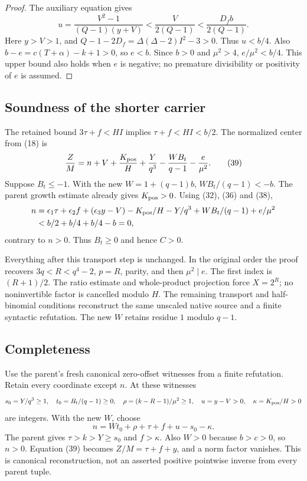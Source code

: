 \begin{proof}
The auxiliary equation gives
\[
u=\frac{V^2-1}{(Q-1)(y+V)}
<\frac{V}{2(Q-1)}<\frac{D_fb}{2(Q-1)}.
\]
Here $y>V>1$, and
$Q-1-2D_f=\Delta(\Delta-2)I^2-3>0$.
Thus $u<b/4$.
Also $b-e=c(T+\alpha)-k+1>0$, so $e<b$.
Since $b>0$ and $\mu^2>4$, $e/\mu^2<b/4$.
This upper bound also holds when $e$ is negative; no premature
divisibility or positivity of $e$ is assumed.
\end{proof}

\subsection{Soundness of the shorter carrier}

The retained bound $3\tau+f<HI$ implies $\tau+f<HI<b/2$.
The normalized center from (18) is
\[
\frac ZM=n+V+\frac{K_{\rm pos}}H+\frac Y{q^3}
-\frac{WB_t}{q-1}-\frac e{\mu^2}.
\tag{39}
\]
Suppose $B_t\le-1$.
With the new $W=1+(q-1)b$, $WB_t/(q-1)<-b$.
The parent growth estimate already gives $K_{\rm pos}>0$.
Using (32), (36) and (38),
\[
\begin{split}
n
&=\epsilon_1\tau+\epsilon_2f+(\epsilon_3y-V)
-K_{\rm pos}/H-Y/q^3+WB_t/(q-1)+e/\mu^2\\
&<b/2+b/4+b/4-b=0,
\end{split}
\]
contrary to $n>0$. Thus $B_t\ge0$ and hence $C>0$.

Everything after this transport step is unchanged.
In the original order the proof recovers $3q<R<q^4-2$, $p=R$, parity,
and then $\mu^2\mid e$. The first index is $(R+1)/2$.
The ratio estimate and whole-product projection force $X=2^R$;
no noninvertible factor is cancelled modulo $H$.
The remaining transport and half-binomial conditions reconstruct the
same unscaled native source and a finite syntactic refutation.
The new $W$ retains residue $1$ modulo $q-1$.

\subsection{Completeness}

Use the parent's fresh canonical zero-offset witnesses from a finite
refutation. Retain every coordinate except $n$. At these witnesses
\[
s_0=Y/q^3\ge1,\quad t_0=B_t/(q-1)\ge0,\quad
\rho=(k-R-1)/\mu^2\ge1,\quad
u=y-V>0,\quad\kappa=K_{\rm pos}/H>0
\]
are integers. With the new $W$, choose
\[
n=Wt_0+\rho+\tau+f+u-s_0-\kappa.
\tag{40}
\]
The parent gives $\tau>k>Y\ge s_0$ and $f>\kappa$.
Also $W>0$ because $b>c>0$, so $n>0$.
Equation (39) becomes $Z/M=\tau+f+y$, and a norm factor vanishes.
This is canonical reconstruction, not an asserted positive pointwise
inverse from every parent tuple.

